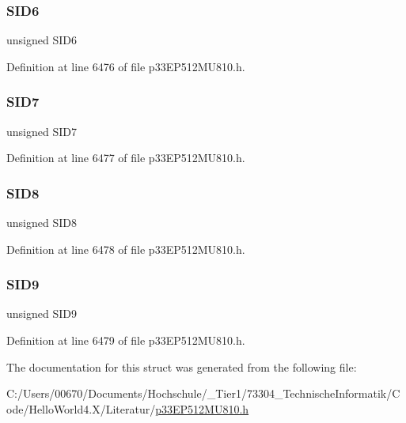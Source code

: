 \subsubsection{\texorpdfstring{S\+I\+D6}{SID6}}
{\footnotesize\ttfamily unsigned S\+I\+D6}



Definition at line 6476 of file p33\+E\+P512\+M\+U810.\+h.

\mbox{\label{structtag_c2_r_x_f5_s_i_d_b_i_t_s_a34097fb76decd431701fa2d86a22328e}} 
\subsubsection{\texorpdfstring{S\+I\+D7}{SID7}}
{\footnotesize\ttfamily unsigned S\+I\+D7}



Definition at line 6477 of file p33\+E\+P512\+M\+U810.\+h.

\mbox{\label{structtag_c2_r_x_f5_s_i_d_b_i_t_s_afe74894633244fdb0b0c01b4e8c522e7}} 
\subsubsection{\texorpdfstring{S\+I\+D8}{SID8}}
{\footnotesize\ttfamily unsigned S\+I\+D8}



Definition at line 6478 of file p33\+E\+P512\+M\+U810.\+h.

\mbox{\label{structtag_c2_r_x_f5_s_i_d_b_i_t_s_a33587704948067005c2a6a3ccc503c99}} 
\subsubsection{\texorpdfstring{S\+I\+D9}{SID9}}
{\footnotesize\ttfamily unsigned S\+I\+D9}



Definition at line 6479 of file p33\+E\+P512\+M\+U810.\+h.



The documentation for this struct was generated from the following file\+:\begin{DoxyCompactItemize}
\item 
C\+:/\+Users/00670/\+Documents/\+Hochschule/\+\_\+\+Tier1/73304\+\_\+\+Technische\+Informatik/\+Code/\+Hello\+World4.\+X/\+Literatur/\hyperlink{p33_e_p512_m_u810_8h}{p33\+E\+P512\+M\+U810.\+h}\end{DoxyCompactItemize}
